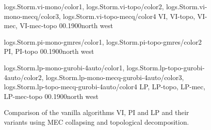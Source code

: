
\begin{figure}[t]
	\centering
	{
		{logs.Storm.vi-mono/color1, logs.Storm.vi-topo/color2, logs.Storm.vi-mono-mecq/color3, logs.Storm.vi-topo-mecq/color4}
		{VI, VI-topo, VI-mec, VI-mec-topo}
		{0}{\numcommunity}{0.1}{900}{north west}%
	}

	{
		{logs.Storm.pi-mono-gmres/color1, logs.Storm.pi-topo-gmres/color2}%
		{PI, PI-topo}%
		{0}{\numcommunity}{0.1}{900}{north west}%
	}

	{
		{logs.Storm.lp-mono-gurobi-4auto/color1, logs.Storm.lp-topo-gurobi-4auto/color2, logs.Storm.lp-mono-mecq-gurobi-4auto/color3, logs.Storm.lp-topo-mecq-gurobi-4auto/color4}
		{LP, LP-topo, LP-mec, LP-mec-topo}
		{0}{\numcommunity}{0.1}{900}{north west}%
	}
	\caption{Comparison of the vanilla algorithms VI, PI and LP and their variants using MEC collapsing and topological decomposition.}
	\label{fig:qvbs-topo-coll}
\end{figure}
